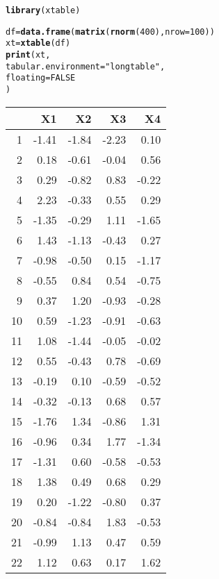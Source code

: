 \documentclass{article}\usepackage[]{graphicx}\usepackage[]{color}
\makeatletter
\newcommand{\hlnum}[1]{\textcolor[rgb]{0.686,0.059,0.569}{#1}}%
\newcommand{\hlstr}[1]{\textcolor[rgb]{0.192,0.494,0.8}{#1}}%
\newcommand{\hlstd}[1]{\textcolor[rgb]{0.345,0.345,0.345}{#1}}%
\newcommand{\hlkwb}[1]{\textcolor[rgb]{0.69,0.353,0.396}{#1}}%
\newcommand{\hlkwc}[1]{\textcolor[rgb]{0.333,0.667,0.333}{#1}}%
\newcommand{\hlkwd}[1]{\textcolor[rgb]{0.737,0.353,0.396}{\textbf{#1}}}%
\newenvironment{kframe}{%
 \def\at@end@of@kframe{}%
 \ifinner\ifhmode%
  \def\at@end@of@kframe{\end{minipage}}%
  \begin{minipage}{\columnwidth}%
 \fi\fi%
 \def\FrameCommand##1{\hskip\@totalleftmargin \hskip-\fboxsep
 \colorbox{shadecolor}{##1}\hskip-\fboxsep
     \hskip-\linewidth \hskip-\@totalleftmargin \hskip\columnwidth}%
 \MakeFramed {\advance\hsize-\width
   \@totalleftmargin\z@ \linewidth\hsize
   \@setminipage}}%
 {\par\unskip\endMakeFramed%
 \at@end@of@kframe}
\makeatother
\begin{document}
\begin{kframe}
\begin{alltt}
  \hlkwd{library}\hlstd{(xtable)}

\hlstd{df} \hlkwb{=} \hlkwd{data.frame}\hlstd{(}\hlkwd{matrix}\hlstd{(}\hlkwd{rnorm}\hlstd{(}\hlnum{400}\hlstd{),} \hlkwc{nrow}\hlstd{=}\hlnum{100}\hlstd{))}
\hlstd{xt} \hlkwb{=} \hlkwd{xtable}\hlstd{(df)}
\hlkwd{print}\hlstd{(xt,}
      \hlkwc{tabular.environment} \hlstd{=} \hlstr{"longtable"}\hlstd{,}
      \hlkwc{floating} \hlstd{=} \hlnum{FALSE}
\hlstd{)}
\end{alltt}
\end{kframe}%
\begin{longtable}{rrrrr}
  \hline
 & X1 & X2 & X3 & X4 \\ 
  \hline
1 & -1.41 & -1.84 & -2.23 & 0.10 \\ 
  2 & 0.18 & -0.61 & -0.04 & 0.56 \\ 
  3 & 0.29 & -0.82 & 0.83 & -0.22 \\ 
  4 & 2.23 & -0.33 & 0.55 & 0.29 \\ 
  5 & -1.35 & -0.29 & 1.11 & -1.65 \\ 
  6 & 1.43 & -1.13 & -0.43 & 0.27 \\ 
  7 & -0.98 & -0.50 & 0.15 & -1.17 \\ 
  8 & -0.55 & 0.84 & 0.54 & -0.75 \\ 
  9 & 0.37 & 1.20 & -0.93 & -0.28 \\ 
  10 & 0.59 & -1.23 & -0.91 & -0.63 \\ 
  11 & 1.08 & -1.44 & -0.05 & -0.02 \\ 
  12 & 0.55 & -0.43 & 0.78 & -0.69 \\ 
  13 & -0.19 & 0.10 & -0.59 & -0.52 \\ 
  14 & -0.32 & -0.13 & 0.68 & 0.57 \\ 
  15 & -1.76 & 1.34 & -0.86 & 1.31 \\ 
  16 & -0.96 & 0.34 & 1.77 & -1.34 \\ 
  17 & -1.31 & 0.60 & -0.58 & -0.53 \\ 
  18 & 1.38 & 0.49 & 0.68 & 0.29 \\ 
  19 & 0.20 & -1.22 & -0.80 & 0.37 \\ 
  20 & -0.84 & -0.84 & 1.83 & -0.53 \\ 
  21 & -0.99 & 1.13 & 0.47 & 0.59 \\ 
  22 & 1.12 & 0.63 & 0.17 & 1.62 \\ 

\end{longtable}
\end{document}
